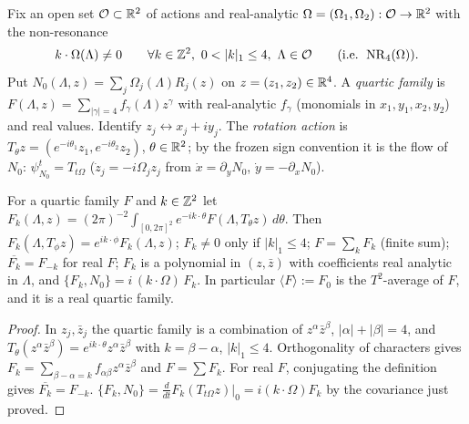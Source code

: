 Fix an open set $\mathcal O\subset\mathbb{R}^2$ of actions and real-analytic $\Omega=(\Omega_1,\Omega_2):\mathcal O\to\mathbb{R}^2$ with the non-resonance
\begin{equation}\label{bpP:p11b:eq:nr}
k\cdot\Omega(\Lambda)\ne0\qquad\forall k\in\mathbb{Z}^2,\ 0<\lvert k\rvert_1\le4,\ \Lambda\in\mathcal O\qquad(\text{i.e. }\operatorname{NR}_4(\Omega)).
\end{equation}
Put $N_0(\Lambda,z)=\sum_j\Omega_j(\Lambda)R_j(z)$ on $z=(z_1,z_2)\in\mathbb{R}^4$. A \emph{quartic family} is $F(\Lambda,z)=\sum_{|\gamma|=4}f_\gamma(\Lambda)z^\gamma$ with real-analytic $f_\gamma$ (monomials in $x_1,y_1,x_2,y_2$) and real values. Identify $z_j\leftrightarrow x_j+iy_j$. The \emph{rotation action} is $T_\theta z=(e^{-i\theta_1}z_1,e^{-i\theta_2}z_2)$, $\theta\in\mathbb{R}^2$; by the frozen sign convention it is the flow of $N_0$: $\psi^t_{N_0}=T_{t\Omega}$ ($\dot z_j=-i\Omega_jz_j$ from $\dot x=\partial_yN_0$, $\dot y=-\partial_xN_0$).

\begin{lemma}\label{bpP:p11b:char}
For a quartic family $F$ and $k\in\mathbb{Z}^2$ let $F_k(\Lambda,z)=(2\pi)^{-2}\int_{[0,2\pi]^2}e^{-ik\cdot\theta}F(\Lambda,T_\theta z)\,d\theta$. Then $F_k(\Lambda,T_\phi z)=e^{ik\cdot\phi}F_k(\Lambda,z)$; $F_k\ne0$ only if $\lvert k\rvert_1\le4$; $F=\sum_kF_k$ (finite sum); $\overline{F_k}=F_{-k}$ for real $F$; $F_k$ is a polynomial in $(z,\bar z)$ with coefficients real analytic in $\Lambda$, and $\{F_k,N_0\}=i\,(k\cdot\Omega)\,F_k$. In particular $\langle F\rangle:=F_0$ is the $T^2$-average of $F$, and it is a real quartic family.
\end{lemma}
\begin{proof}
\label{stepP:p11b:ch-mon} In $z_j,\bar z_j$ the quartic family is a combination of $z^\alpha\bar z^\beta$, $\lvert\alpha\rvert+\lvert\beta\rvert=4$, and $T_\theta(z^\alpha\bar z^\beta)=e^{ik\cdot\theta}z^\alpha\bar z^\beta$ with $k=\beta-\alpha$, $\lvert k\rvert_1\le4$. Orthogonality of characters gives $F_k=\sum_{\beta-\alpha=k}f_{\alpha\beta}z^\alpha\bar z^\beta$ and $F=\sum F_k$.
\label{stepP:p11b:ch-bra} For real $F$, conjugating the definition gives $\overline{F_k}=F_{-k}$. $\{F_k,N_0\}=\frac d{dt}F_k(T_{t\Omega}z)|_0=i(k\cdot\Omega)F_k$ by the covariance just proved.
\end{proof}

